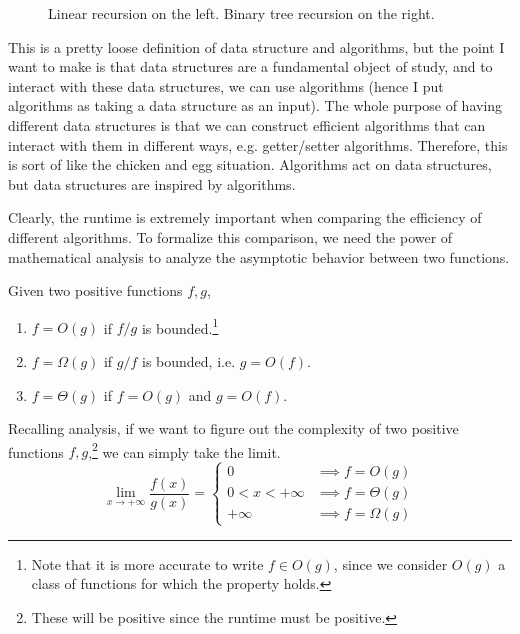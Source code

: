 \begin{figure}[H]
  \caption{Linear recursion on the left. Binary tree recursion on the right. } 
  \label{fig:recursion_fig}
\end{figure}

This is a pretty loose definition of data structure and algorithms, but the point I want to make is that data structures are a fundamental object of study, and to interact with these data structures, we can use algorithms (hence I put algorithms as taking a data structure as an input). The whole purpose of having different data structures is that we can construct efficient algorithms that can interact with them in different ways, e.g. getter/setter algorithms. Therefore, this is sort of like the chicken and egg situation. Algorithms act on data structures, but data structures are inspired by algorithms.  

Clearly, the runtime is extremely important when comparing the efficiency of different algorithms. To formalize this comparison, we need the power of mathematical analysis to analyze the asymptotic behavior between two functions.  

\begin{definition}[Complexity]
  Given two positive functions $f, g$, 
  \begin{enumerate}
    \item $f = O(g)$ if $f/g$ is bounded.\footnote{Note that it is more accurate to write $f \in O(g)$, since we consider $O(g)$ a class of functions for which the property holds.} 
    \item $f = \Omega(g)$ if $g/f$ is bounded, i.e. $g = O(f)$. 
    \item $f = \Theta (g)$ if $f = O(g)$ and $g = O(f)$. 
  \end{enumerate}
  Recalling analysis, if we want to figure out the complexity of two positive functions $f, g$,\footnote{These will be positive since the runtime must be positive.} we can simply take the limit. 
  \begin{equation}
    \lim_{x \rightarrow +\infty} \frac{f(x)}{g(x)} = \begin{cases} 
      0 & \implies f = O(g) \\
      0 < x < +\infty & \implies f = \Theta(g) \\
      +\infty & \implies f = \Omega(g)
    \end{cases}
  \end{equation} 
\end{definition}

